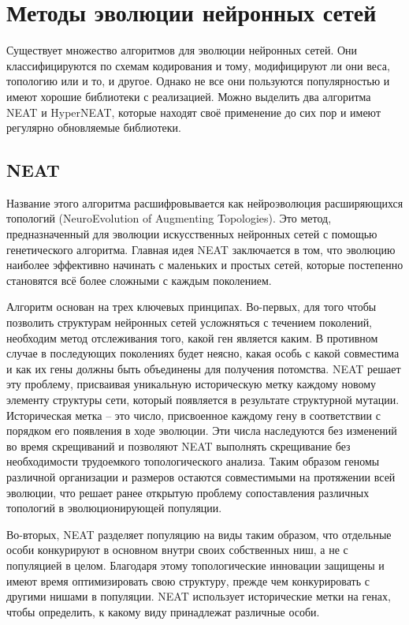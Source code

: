 ﻿%
\section{Методы эволюции нейронных сетей}\label{sec:evolutionMethods}

Существует множество алгоритмов для эволюции нейронных сетей. Они классифицируются по схемам кодирования и тому, модифицируют ли они веса, топологию или и то, и другое. Однако не все они пользуются популярностью и имеют хорошие библиотеки с реализацией. Можно выделить два алгоритма NEAT\cite{s1} и HyperNEAT\cite{s16}, которые находят своё применение до сих пор и имеют регулярно обновляемые библиотеки.

\subsection{NEAT}

Название этого алгоритма расшифровывается как нейроэволюция расширяющихся топологий (NeuroEvolution of Augmenting Topologies). Это метод, предназначенный для эволюции искусственных нейронных сетей с помощью генетического алгоритма. Главная идея NEAT заключается в том, что эволюцию наиболее эффективно начинать с маленьких и простых сетей, которые постепенно становятся всё более сложными с каждым поколением.

Алгоритм основан на трех ключевых принципах. Во-первых, для того чтобы позволить структурам нейронных сетей усложняться с течением поколений, необходим метод отслеживания того, какой ген является каким. В противном случае в последующих поколениях будет неясно, какая особь с какой совместима и как их гены должны быть объединены для получения потомства. NEAT решает эту проблему, присваивая уникальную историческую метку каждому новому элементу структуры сети, который появляется в результате структурной мутации. Историческая метка – это число, присвоенное каждому гену в соответствии с порядком его появления в ходе эволюции. Эти числа наследуются без изменений во время скрещиваний и позволяют NEAT выполнять скрещивание без необходимости трудоемкого топологического анализа. Таким образом геномы различной организации и размеров остаются совместимыми на протяжении всей эволюции, что решает ранее открытую проблему сопоставления различных топологий в эволюционирующей популяции. 

Во-вторых, NEAT разделяет популяцию на виды таким образом, что отдельные особи конкурируют в основном внутри своих собственных ниш, а не с популяцией в целом. Благодаря этому топологические инновации защищены и имеют время оптимизировать свою структуру, прежде чем конкурировать с другими нишами в популяции. NEAT использует исторические метки на генах, чтобы определить, к какому виду принадлежат различные особи. 

